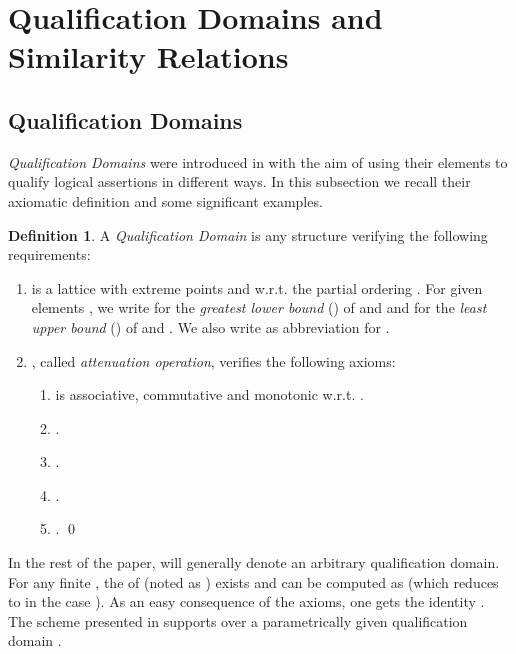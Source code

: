 \documentclass{sigplanconf}
\theoremstyle{definition}
\newtheorem{definition}{Definition}
\theoremstyle{plain}
\begin{document}
\section{Qualification Domains and Similarity Relations} \label{Domains}

\subsection{Qualification Domains} \label{QD}
{\em Qualification Domains}  were introduced in \cite{RR08} with the aim of using their elements to qualify logical assertions in different ways. In this subsection we recall their axiomatic definition and some significant examples.


\begin{definition}  \label{defQD}
A  {\em Qualification Domain} is any structure   verifying the following requirements:
\begin{enumerate}
    \item  is a lattice with extreme points  and  w.r.t. the partial ordering . For given elements  , we  write  for the {\em greatest lower bound} () of  and  and  for the {\em least upper bound} () of  and . We also write  as abbreviation for .
    \item , called {\em attenuation operation}, verifies the following axioms:
        \begin{enumerate}
            \item  is associative, commutative and monotonic w.r.t. .
            \item .
            \item .
            \item .
            \item . \qed
        \end{enumerate}
\end{enumerate}
\end{definition}

In the rest of the paper,  will generally denote an arbitrary qualification domain. For any finite , the  of  (noted as ) exists and can be computed as  (which reduces to  in the case ). As an easy consequence of the axioms, one gets the identity .  The  scheme presented in \cite{RR08} supports  over a parametrically given qualification domain .
\end{document}
